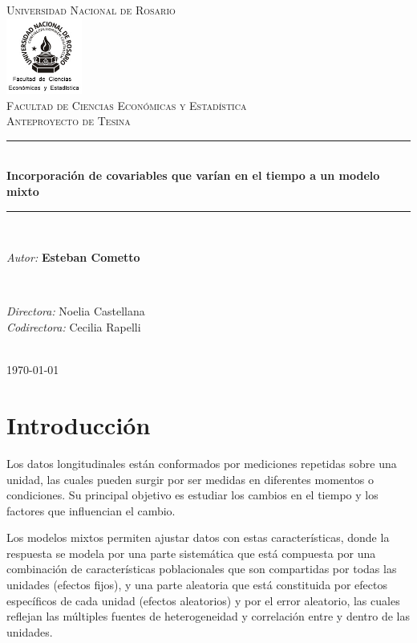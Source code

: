 \documentclass[spanish]{article}
\title{\thesistitle}
\author{\thesisauthorfirst\space\thesisauthorsecond}
\date{\thesisdate}
\numberwithin{figure}{subsection}
\numberwithin{equation}{subsection}
\numberwithin{table}{subsection}
\def\thesistitle{Incorporación de covariables que varían en el tiempo a un modelo mixto}
\def\thesisauthorfirst{\textbf{Esteban Cometto}}
\def\thesissupervisorfirst{Noelia Castellana}
\def\thesissupervisorsecond{Cecilia Rapelli}
\def\thesisdate{\today}
\begin{document}
\begin{titlepage}
    \newcommand{\HRule}{\rule{\linewidth}{0.5mm}}
	\center
	\textsc{\Large Universidad Nacional de Rosario}\\[.7cm]
	\includegraphics[width=25mm]{img/fceye-unr.png}\\[.5cm]
	\textsc{Facultad de Ciencias Económicas y Estadística}\\[0.5cm]
	\textsc{Anteproyecto de Tesina}
	
	\HRule \\[0.4cm]
	{ \huge \bfseries \thesistitle}\\[0.1cm]
	\HRule \\[.5cm]
	
	\begin{minipage}{0.6\textwidth}
	\large
	\textit{Autor:}	\thesisauthorfirst
	\end{minipage}
	\\[.6cm]
	\begin{minipage}{0.6\textwidth}
	\textit{Directora:} 	\thesissupervisorfirst \\[.2cm]
	\textit{Codirectora:} 	\thesissupervisorsecond
	\end{minipage}
	\\[4cm]
	\vfill
	{\large \thesisdate}\\
	\clearpage
\end{titlepage}

\newpage
\tableofcontents

\newpage
\section{Introducción}

Los datos longitudinales están conformados por mediciones repetidas sobre una
unidad, las cuales pueden surgir por ser medidas en diferentes momentos o
condiciones. Su principal objetivo es estudiar los cambios en el tiempo y los
factores que influencian el cambio. 

Los modelos mixtos permiten ajustar datos con estas características, donde la
respuesta se modela por una parte sistemática que está compuesta por una
combinación de características poblacionales que son compartidas por todas las
unidades (efectos fijos), y una parte aleatoria que está constituida por efectos
específicos de cada unidad (efectos aleatorios) y por el error aleatorio, las
cuales reflejan las múltiples fuentes de heterogeneidad y correlación entre y
dentro de las unidades.
\end{document}
